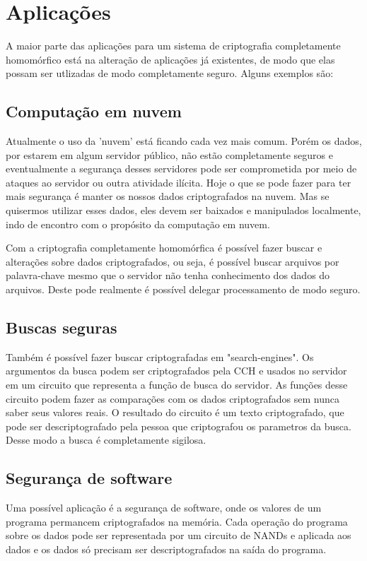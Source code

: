 \chapter{Aplicações}
\label{desenvolvimento}
A maior parte das aplicações para um sistema de criptografia completamente homomórfico está na alteração de aplicações já existentes, de modo que elas possam ser utlizadas de modo completamente seguro. Alguns exemplos são:

\section{Computação em nuvem}
Atualmente o uso da 'nuvem' está ficando cada vez mais comum. Porém os dados, por estarem em algum servidor público, não estão completamente seguros e eventualmente a segurança desses servidores pode ser comprometida por meio de ataques ao servidor ou outra atividade ilícita.
Hoje o que se pode fazer para ter mais segurança é manter os nossos dados criptografados na nuvem. Mas se quisermos utilizar esses dados, eles devem ser baixados e manipulados localmente, indo de encontro com o propósito da computação em nuvem.
	
Com a criptografia completamente homomórfica é possível fazer buscar e alterações sobre dados criptografados, ou seja, é possível buscar arquivos por palavra-chave mesmo que o servidor não tenha conhecimento dos dados do arquivos. Deste pode realmente é possível delegar processamento de modo seguro.
	
\section{Buscas seguras}
Também é possível fazer buscar criptografadas em "search-engines". Os argumentos da busca podem ser criptografados pela CCH e usados no servidor em um circuito que representa a função de busca do servidor. As funções desse circuito podem fazer as comparações com os dados criptografados sem nunca saber seus valores reais.
O resultado do circuito é um texto criptografado, que pode ser descriptografado pela pessoa que criptografou os parametros da busca. Desse modo a busca é completamente sigilosa.
	
\section{Segurança de software}
Uma possível aplicação é a segurança de software, onde os valores de um programa permancem criptografados na memória. Cada operação do programa sobre os dados pode ser representada por um circuito de NANDs e aplicada aos dados e os dados só precisam ser descriptografados na saída do programa.
	
